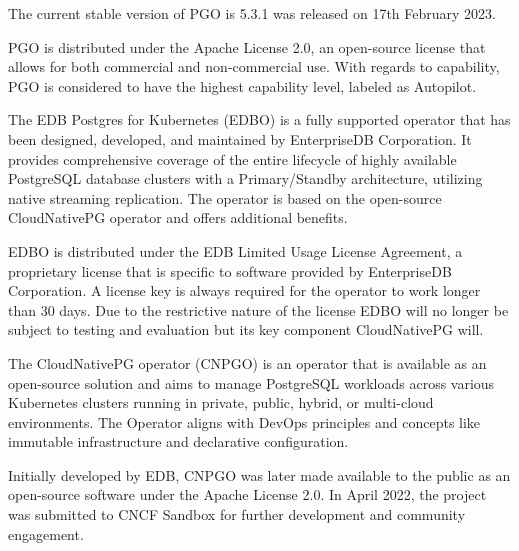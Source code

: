 The current stable version of PGO is 5.3.1 was released on 17th February 2023. \cite{CrunchyV531releaseNotes}

PGO is distributed under the Apache License 2.0, an open-source license that allows for both commercial and non-commercial use. With regards to capability, PGO is considered to have the highest capability level, labeled as Autopilot. \cite{OperatorHubCrunchy}

The EDB Postgres for Kubernetes (EDBO) is a fully supported operator that has been designed, developed, and maintained by EnterpriseDB Corporation. It provides comprehensive coverage of the entire lifecycle of highly available PostgreSQL database clusters with a Primary/Standby architecture, utilizing native streaming replication. The operator is based on the open-source CloudNativePG operator and offers additional benefits. \cite{OperatorHubEDB}

EDBO is distributed under the EDB Limited Usage License Agreement, a proprietary license that is specific to software provided by EnterpriseDB Corporation. A license key is always required for the operator to work longer than 30 days. \cite{EDBdocuLicence} Due to the restrictive nature of the license EDBO will no longer be subject to testing and evaluation but its key component CloudNativePG will.

The CloudNativePG operator (CNPGO) is an operator that is available as an open-source solution and aims to manage PostgreSQL workloads across various Kubernetes clusters running in private, public, hybrid, or multi-cloud environments. The Operator aligns with DevOps principles and concepts like immutable infrastructure and declarative configuration. \cite{CNPGdocu}

Initially developed by EDB, CNPGO was later made available to the public as an open-source software under the Apache License 2.0. In April 2022, the project was submitted to CNCF Sandbox for further development and community engagement. \cite{CNPGdocu}

